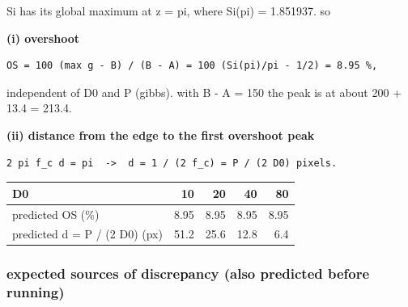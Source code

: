 Si has its global maximum at z = pi, where Si(pi) = 1.851937. so

\textbf{(i) overshoot}

\begin{verbatim}
OS = 100 (max g - B) / (B - A) = 100 (Si(pi)/pi - 1/2) = 8.95 %,
\end{verbatim}

independent of D0 and P (gibbs). with B - A = 150 the peak is at about 200 + 13.4 = 213.4.

\textbf{(ii) distance from the edge to the first overshoot peak}

\begin{verbatim}
2 pi f_c d = pi  ->  d = 1 / (2 f_c) = P / (2 D0) pixels.
\end{verbatim}

\begin{tabular}{lrrrr}
\hline
D0 & 10 & 20 & 40 & 80 \\
\hline
predicted OS (\%) & 8.95 & 8.95 & 8.95 & 8.95 \\
predicted d = P / (2 D0) (px) & 51.2 & 25.6 & 12.8 & 6.4 \\
\hline
\end{tabular}

\subsubsection*{expected sources of discrepancy (also predicted before running)}

